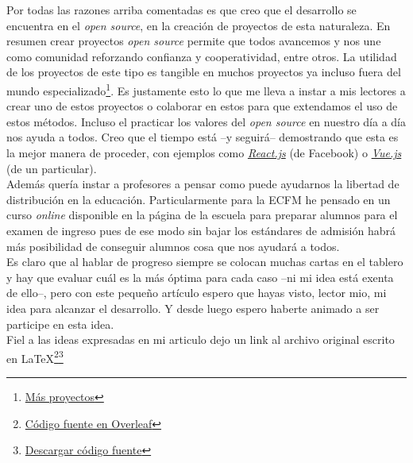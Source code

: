 \documentclass{article}
\begin{document}
Por todas las razones arriba comentadas es que creo que el desarrollo se encuentra en el \textit{open source}, en la creación de proyectos de esta naturaleza. En resumen crear proyectos \textit{open source} permite que todos avancemos y nos une como comunidad reforzando confianza y cooperatividad, entre otros. La utilidad de los proyectos de este tipo es tangible en muchos proyectos ya incluso fuera del mundo especializado\footnote{\href{https://www.redhat.com/en/open-source-stories}{Más proyectos}}. Es justamente esto lo que me lleva a instar a mis lectores a crear uno de estos proyectos o colaborar en estos para que extendamos el uso de estos métodos. Incluso el practicar los valores del \textit{open source} en nuestro día a día nos ayuda a todos. Creo que el tiempo está –y seguirá– demostrando que esta es la mejor manera de proceder, con ejemplos como \textit{\href{https://reactjs.org/}{React.js}} (de Facebook) o \textit{\href{https://vuejs.org/}{Vue.js}} (de un particular).\\

Además quería instar a profesores a pensar como puede ayudarnos la libertad de distribución en la educación. Particularmente para la ECFM he pensado en un curso \textit{online} disponible en la página de la escuela para preparar alumnos para el examen de ingreso pues de ese modo sin bajar los estándares de admisión habrá más posibilidad de conseguir alumnos cosa que nos ayudará a todos.\\

Es claro que al hablar de progreso siempre se colocan muchas cartas en el tablero y hay que evaluar cuál es la más óptima para cada caso –ni mi idea está exenta de ello–, pero con este pequeño artículo espero que hayas visto, lector mio, mi idea para alcanzar el desarrollo. Y desde luego espero haberte animado a ser participe en esta idea.\\

Fiel a las ideas expresadas en mi articulo dejo un link al archivo original escrito en \LaTeX\footnote{\href{https://www.overleaf.com/docs?snip_uri=https://amadocab.github.io/Intentopages/main.tex}{Código fuente en Overleaf}}\footnote{\href{https://amadocab.github.io/Intentopages/main.tex}{Descargar código fuente}}

\end{document}
